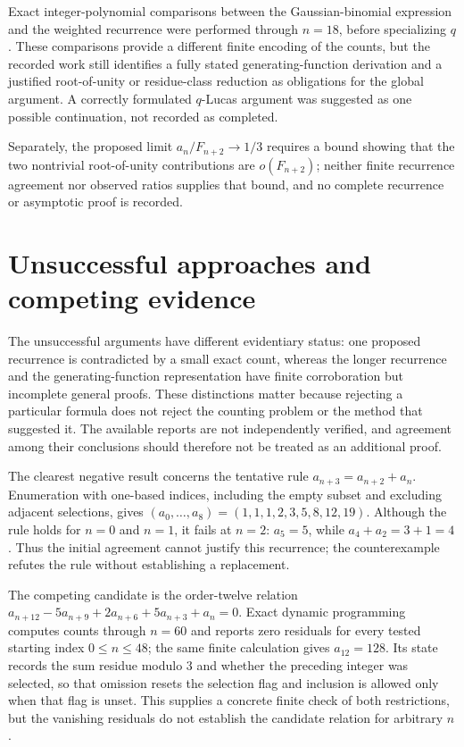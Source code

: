 \documentclass[11pt]{article}
\begin{document}
Exact integer-polynomial comparisons between the Gaussian-binomial expression and the weighted recurrence were performed through $n=18$, before specializing $q$. These comparisons provide a different finite encoding of the counts, but the recorded work still identifies a fully stated generating-function derivation and a justified root-of-unity or residue-class reduction as obligations for the global argument. A correctly formulated $q$-Lucas argument was suggested as one possible continuation, not recorded as completed.

Separately, the proposed limit $a_n/F_{n+2}\to1/3$ requires a bound showing that the two nontrivial root-of-unity contributions are $o(F_{n+2})$; neither finite recurrence agreement nor observed ratios supplies that bound, and no complete recurrence or asymptotic proof is recorded.

\section{Unsuccessful approaches and competing evidence}
The unsuccessful arguments have different evidentiary status: one proposed recurrence is contradicted by a small exact count, whereas the longer recurrence and the generating-function representation have finite corroboration but incomplete general proofs. These distinctions matter because rejecting a particular formula does not reject the counting problem or the method that suggested it. The available reports are not independently verified, and agreement among their conclusions should therefore not be treated as an additional proof.

The clearest negative result concerns the tentative rule $a_{n+3}=a_{n+2}+a_n$. Enumeration with one-based indices, including the empty subset and excluding adjacent selections, gives $(a_0,\ldots,a_8)=(1,1,1,2,3,5,8,12,19)$. Although the rule holds for $n=0$ and $n=1$, it fails at $n=2$: $a_5=5$, while $a_4+a_2=3+1=4$. Thus the initial agreement cannot justify this recurrence; the counterexample refutes the rule without establishing a replacement.

The competing candidate is the order-twelve relation $a_{n+12}-5a_{n+9}+2a_{n+6}+5a_{n+3}+a_n=0$. Exact dynamic programming computes counts through $n=60$ and reports zero residuals for every tested starting index $0\leq n\leq48$; the same finite calculation gives $a_{12}=128$. Its state records the sum residue modulo $3$ and whether the preceding integer was selected, so that omission resets the selection flag and inclusion is allowed only when that flag is unset. This supplies a concrete finite check of both restrictions, but the vanishing residuals do not establish the candidate relation for arbitrary $n$.
\end{document}
